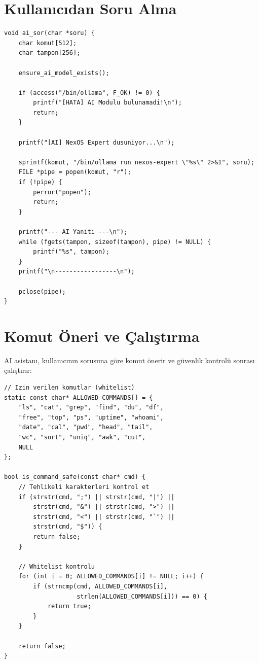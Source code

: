 \documentclass[12pt,a4paper]{report}
\begin{document}
\section{Kullanıcıdan Soru Alma}

\begin{lstlisting}[caption={AI Soru Fonksiyonu}]
void ai_sor(char *soru) {
    char komut[512];
    char tampon[256];
    
    ensure_ai_model_exists();
    
    if (access("/bin/ollama", F_OK) != 0) {
        printf("[HATA] AI Modulu bulunamadi!\n");
        return;
    }

    printf("[AI] NexOS Expert dusuniyor...\n");
    
    sprintf(komut, "/bin/ollama run nexos-expert \"%s\" 2>&1", soru);
    FILE *pipe = popen(komut, "r");
    if (!pipe) {
        perror("popen");
        return;
    }
    
    printf("--- AI Yaniti ---\n");
    while (fgets(tampon, sizeof(tampon), pipe) != NULL) {
        printf("%s", tampon);
    }
    printf("\n-----------------\n");
    
    pclose(pipe);
}
\end{lstlisting}

\section{Komut Öneri ve Çalıştırma}

AI asistanı, kullanıcının sorusuna göre komut önerir ve güvenlik kontrolü sonrası çalıştırır:

\begin{lstlisting}[caption={Komut Guvenlik Kontrolu}]
// Izin verilen komutlar (whitelist)
static const char* ALLOWED_COMMANDS[] = {
    "ls", "cat", "grep", "find", "du", "df",
    "free", "top", "ps", "uptime", "whoami",
    "date", "cal", "pwd", "head", "tail",
    "wc", "sort", "uniq", "awk", "cut",
    NULL
};

bool is_command_safe(const char* cmd) {
    // Tehlikeli karakterleri kontrol et
    if (strstr(cmd, ";") || strstr(cmd, "|") ||
        strstr(cmd, "&") || strstr(cmd, ">") ||
        strstr(cmd, "<") || strstr(cmd, "`") ||
        strstr(cmd, "$")) {
        return false;
    }
    
    // Whitelist kontrolu
    for (int i = 0; ALLOWED_COMMANDS[i] != NULL; i++) {
        if (strncmp(cmd, ALLOWED_COMMANDS[i], 
                    strlen(ALLOWED_COMMANDS[i])) == 0) {
            return true;
        }
    }
    
    return false;
}
\end{lstlisting}
\end{document}
